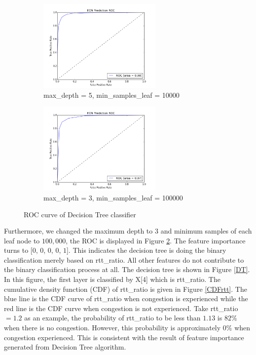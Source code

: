 \begin{figure}[!htb]\centering
   \begin{subfigure}{0.49\textwidth}
     \includegraphics[width=6cm]{DecisionTreeRoc.png}
\caption{max\_depth = 5, min\_samples\_leaf = 10000}
\label{DecisionTreeRoc}

   \end{subfigure}
   \begin {subfigure}{0.49\textwidth}
     \includegraphics[width=6cm]{DTRoc.png}
\caption{max\_depth = 3, min\_samples\_leaf = 100000}
\label{DTRoc}
   \end{subfigure}
   \caption{ROC curve of Decision Tree classifier}
\label{fig:roc1}
\end{figure}
Furthermore, we changed the maximum depth to $3$ and minimum samples of each leaf node to $100,000$, the ROC is displayed in Figure \ref{DTRoc}. The feature importance turns to [$0$, $0$, $0$, $0$, $1$]. This indicates the decision tree is doing the binary classification merely based on rtt\_ratio. All other features do not contribute to the binary classification process at all. 
The decision tree is shown in Figure \ref{DT}. In this figure, the first layer is classified by X[4] which is rtt\_ratio. The cumulative density function (CDF) of rtt\_ratio is given in Figure \ref{CDFrtt}. The blue line is the CDF curve of rtt\_ratio when congestion is experienced while the red line is the CDF curve when congestion is not experienced. Take rtt\_ratio $=1.2$ as an example, the probability of rtt\_ratio to be less than $1.13$ is $82\%$ when there is no congestion. However, this probability is approximately $0\%$ when congestion experienced. This is consistent with the result of feature importance generated from Decision Tree algorithm. 

